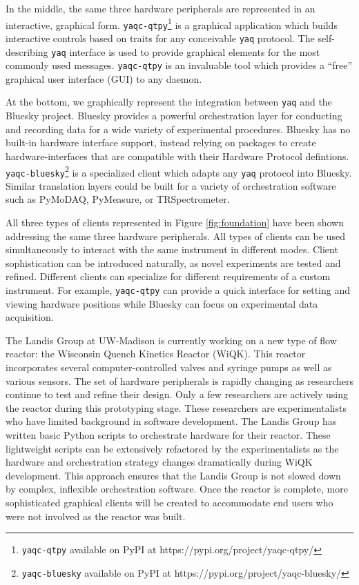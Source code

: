 \documentclass[aip, amsmath, amssymb, reprint,]{revtex4-2}
\newcommand\yaq{\texttt{yaq}}
\begin{document}
In the middle, the same three hardware peripherals are represented in an interactive, graphical form.
\texttt{yaqc-qtpy}\footnote{\texttt{yaqc-qtpy} available on PyPI at https://pypi.org/project/yaqc-qtpy/} is a graphical application which builds interactive controls based on traits for any conceivable \yaq{} protocol.
The self-describing \yaq{} interface is used to provide graphical elements for the most commonly used messages.
\texttt{yaqc-qtpy} is an invaluable tool which provides a ``free'' graphical user interface (GUI) to any daemon.

At the bottom, we graphically represent the integration between \yaq{} and the Bluesky project\cite{AllanDanielB2019a}.
Bluesky provides a powerful orchestration layer for conducting and recording data for a wide variety of experimental procedures.
Bluesky has no built-in hardware interface support, instead relying on packages to create hardware-interfaces that are compatible with their Hardware Protocol defintions.
\texttt{yaqc-bluesky}\footnote{\texttt{yaqc-bluesky} available on PyPI at https://pypi.org/project/yaqc-bluesky/} is a specialized client which adapts any \yaq{} protocol into Bluesky.
Similar translation layers could be built for a variety of orchestration software such as PyMoDAQ\cite{WeberSebastien2021a}, PyMeasure\cite{pymeasure}, or TRSpectrometer\cite{trspectrometer}.

All three types of clients represented in Figure \ref{fig:foundation} have been shown addressing the same three hardware peripherals.
All types of clients can be used simultaneously to interact with the same instrument in different modes.
Client sophistication can be introduced naturally, as novel experiments are tested and refined.
Different clients can specialize for different requirements of a custom instrument.
For example, \texttt{yaqc-qtpy} can provide a quick interface for setting and viewing hardware positions while Bluesky can focus on experimental data acquisition.

The Landis Group at UW-Madison is currently working on a new type of flow reactor: the Wisconsin Quench Kinetics Reactor (WiQK).
This reactor incorporates several computer-controlled valves and syringe pumps as well as various sensors.
The set of hardware peripherals is rapidly changing as researchers continue to test and refine their design.
Only a few researchers are actively using the reactor during this prototyping stage.
These researchers are experimentalists who have limited background in software development.
The Landis Group has written basic Python scripts to orchestrate hardware for their reactor.
These lightweight scripts can be extensively refactored by the experimentalists as the hardware and orchestration strategy changes dramatically during WiQK development.
This approach ensures that the Landis Group is not slowed down by complex, inflexible orchestration software.
Once the reactor is complete, more sophisticated graphical clients will be created to accommodate end users who were not involved as the reactor was built.
\end{document}
